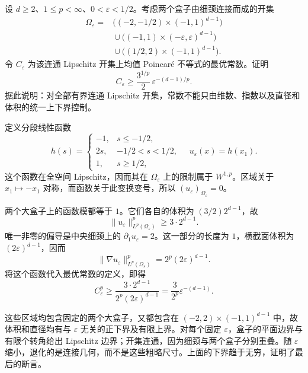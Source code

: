 \begin{optionalexercise}\label{b1:ex:24-thin-neck-constant}
设 \(d\ge2\)、\(1\le p<\infty\)、\(0<\varepsilon<1/2\)。考虑两个盒子由细颈连接而成的开集
\[
 \begin{aligned}
 \Omega_\varepsilon={}&
   \bigl((-2,-1/2)\times(-1,1)^{d-1}\bigr)\\
 &{}\cup\bigl((-1,1)\times(-\varepsilon,\varepsilon)^{d-1}\bigr)\\
 &{}\cup\bigl((1/2,2)\times(-1,1)^{d-1}\bigr).
 \end{aligned}
\]
令 \(C_\varepsilon\) 为该连通 Lipschitz 开集上均值 Poincaré 不等式的最优常数。证明
\[
 C_\varepsilon\ge
       \frac{3^{1/p}}2\,\varepsilon^{-(d-1)/p}.
\]
据此说明：对全部有界连通 Lipschitz 开集，常数不能只由维数、指数以及直径和体积的统一上下界控制。
\end{optionalexercise}
\begin{solution}
定义分段线性函数
\[
 h(s)=
 \begin{cases}
  -1,&s\le-1/2,\\
  2s,&-1/2<s<1/2,\\
  1,&s\ge1/2,
 \end{cases}
 \quad u_\varepsilon(x)=h(x_1).
\]
这个函数在全空间 Lipschitz，因而其在 \(\Omega_\varepsilon\) 上的限制属于
\(W^{1,p}\)。区域关于 \(x_1\mapsto-x_1\) 对称，而函数关于此变换变号，所以
\((u_\varepsilon)_{\Omega_\varepsilon}=0\)。

两个大盒子上的函数模都等于 \(1\)。它们各自的体积为
\((3/2)2^{d-1}\)，故
\[
 \|u_\varepsilon\|_{L^p(\Omega_\varepsilon)}^p
              \ge3\cdot2^{d-1}.
\]
唯一非零的偏导是中央细颈上的 \(\partial_1u_\varepsilon=2\)。这一部分的长度为 \(1\)，横截面体积为 \((2\varepsilon)^{d-1}\)，因而
\[
 \|\nabla u_\varepsilon\|_{L^p(\Omega_\varepsilon)}^p
              =2^p(2\varepsilon)^{d-1}.
\]
将这个函数代入最优常数的定义，即得
\[
 C_\varepsilon^p\ge
     \frac{3\cdot2^{d-1}}{2^p(2\varepsilon)^{d-1}}
     =\frac3{2^p}\varepsilon^{-(d-1)}.
\]

这些区域均包含固定的两个大盒子，又都包含在
\((-2,2)\times(-1,1)^{d-1}\) 中，故体积和直径均有与 \(\varepsilon\) 无关的正下界及有限上界。对每个固定 \(\varepsilon\)，盒子的平面边界与有限个转角给出 Lipschitz 边界；开集连通，因为细颈与两个盒子分别重叠。随 \(\varepsilon\) 缩小，退化的是连接几何，而不是这些粗略尺寸。上面的下界趋于无穷，证明了最后的断言。
\end{solution}


